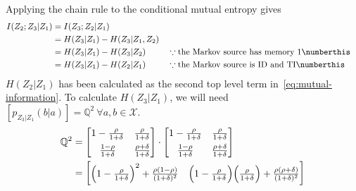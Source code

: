 \documentclass[
  coursecode={MTHE 474},
  assignmentname={Homework \homeworknumber},
  studentnumber=20053722,
  name={Bryan Hoang},
  draft,
]{
  ltxanswer%
}
\begin{document}
\begin{questions}
\begin{parts}
\begin{solution}
        Applying the chain rule to the conditional mutual entropy gives
        \begin{align*}
          I(Z_{2};Z_{3}|Z_{1}) &= I(Z_{3};Z_{2}|Z_{1})                                                                                                                                   \\
                               &= H(Z_{3}|Z_{1}) - H(Z_{3}|Z_{1},Z_{2})                                                                                                                  \\
                               &= H(Z_{3}|Z_{1}) - H(Z_{3}|Z_{2})       & &\because \text{the Markov source has memory 1}\numberthis\label{eq:conditional-mutual-information-chain-rule} \\
                               &= H(Z_{3}|Z_{1}) - H(Z_{2}|Z_{1})       & &\because \text{the Markov source is ID and TI}\numberthis\label{eq:chain-rule}
        \end{align*}
        \(H(Z_{2}|Z_{1})\) has been calculated as the second top level term in~\eqref{eq:mutual-information}. To calculate \(H(Z_{3}|Z_{1})\), we will need \([p_{Z_{3}|Z_{1}}(b|a)] = \mathbb{Q}^{2}\ \forall a,b\in\mathcal{X}\).
        \begin{align*}
          \mathbb{Q}^2 &= \begin{bmatrix}
                            1-\frac{\rho}{1+\delta} & \frac{\rho}{1+\delta}        \\[1ex]
                            \frac{1-\rho}{1+\delta} & \frac{\rho+\delta}{1+\delta} \\
                          \end{bmatrix} \cdot \begin{bmatrix}
                                                1-\frac{\rho}{1+\delta} & \frac{\rho}{1+\delta}        \\[1ex]
                                                \frac{1-\rho}{1+\delta} & \frac{\rho+\delta}{1+\delta} \\
                                              \end{bmatrix}                                                                                                       \\
                       &= \begin{bmatrix}
                            \Bigl(1-\frac{\rho}{1+\delta}\Bigr)^2 + \frac{\rho(1-\rho)}{(1+\delta)^2}                                           & \Bigl(1-\frac{\rho}{1+\delta}\Bigr)\Bigl(\frac{\rho}{1+\delta}\Bigr) + \frac{\rho(\rho+\delta)}{(1+\delta)^2} \\

\end{bmatrix}
\end{align*}
\end{solution}
\end{parts}
\end{questions}
\end{document}
